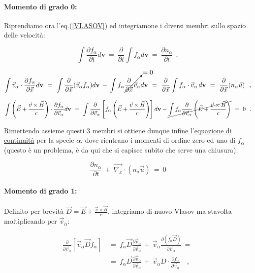 \paragraph{Momento di grado 0: } Riprendiamo ora l'eq.(\ref{VLASOV}) ed integriamone i diversi membri sullo spazio delle velocità:

\[ \int \frac{\partial f_\alpha}{\partial t} d\textbf{v} \ =\ \frac{\partial }{\partial t} \int f_\alpha d\textbf{v} \ =\ \frac{\partial n_\alpha}{\partial t}\ \ ,\]

\[ \int \vec v_\alpha \cdot \frac{\partial f_\alpha}{\partial \vec x} d\textbf{v}\ =\ \int \frac{\partial}{\partial \vec x} (\vec v_\alpha f_\alpha) d\textbf{v}\, -\, \int f_\alpha \cancelto{=0}{\frac{\partial}{\partial \vec x } \vec v_\alpha}d\textbf{v} \ =\ \frac{\partial }{\partial \vec x} \int f_\alpha\cdot \vec v_\alpha\, d\textbf{v} \ =\ \frac{\partial}{\partial \vec x}(n_\alpha \vec u)\ \ , \]

\[  \int \left(\vec E + \frac{\vec v\times\vec B}{c}\right) \cdot \frac{\partial f_\alpha}{\partial \vec v_\alpha} d\textbf{v}\ =\ \int \frac{\partial}{\partial \vec v_\alpha} \left[f_\alpha  \left( \vec E + \frac{\vec v\times\vec B}{c}\right)  \right] d\textbf{v} - \cancel{\int f_\alpha \frac{\partial}{\partial \vec v_\alpha} \left( \vec E + \frac{\vec v\times\vec B}{c}\right)}\ =\ 0\ \ . \]

Rimettendo assieme questi 3 membri si ottiene dunque infine l'\underline{equazione di continuità} per la specie $\alpha$, dove rientrano i momenti di ordine zero ed uno di $f_\alpha$ (questo è un problema, è da qui che si capisce subito che serve una chiusura):

\begin{equation}
	\boxed{\ \frac{\partial n_\alpha}{\partial t}\ +\  \vec{\nabla_x} \cdot \left( n_a \vec u\right)\ =\ 0\ }
\end{equation}

\paragraph{Momento di grado 1: } Definito per brevità $\vec D = \vec E +\frac{\vec v \times \vec B}{c}$, integriamo di nuovo Vlasov ma stavolta moltiplicando per $\vec v_\alpha$:

\[\begin{split}\frac{\partial}{\partial \vec v_\alpha} \left[ \vec v_\alpha \vec D f_\alpha\right] \ 
&=\  f_\alpha \vec D \frac{\partial \vec v_\alpha }{\partial\vec v_\alpha} \,+\, \vec v_\alpha \frac{\partial(f_\alpha \vec D)}{\partial\vec v_\alpha}\ =\ \\ 
&=\ f_\alpha \vec D \frac{\partial \vec v_\alpha }{\partial\vec v_\alpha}\, +\, \vec v_\alpha D\cdot \frac{\partial f_\alpha }{\partial\vec v_\alpha} \quad ,\end{split}\]

